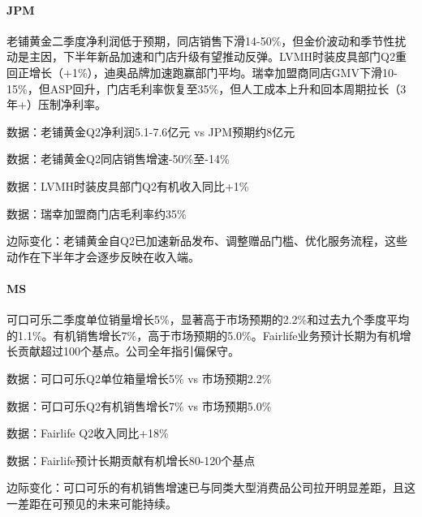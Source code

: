 \documentclass[11pt]{ctexart}
\begin{document}
\paragraph{JPM} 老铺黄金二季度净利润低于预期，同店销售下滑14-50\%，但金价波动和季节性扰动是主因，下半年新品加速和门店升级有望推动反弹。LVMH时装皮具部门Q2重回正增长（+1\%），迪奥品牌加速跑赢部门平均。瑞幸加盟商同店GMV下滑10-15\%，但ASP回升，门店毛利率恢复至35\%，但人工成本上升和回本周期拉长（3年+）压制净利率。
{\small\color{refgray}数据：老铺黄金Q2净利润5.1-7.6亿元 vs JPM预期约8亿元\par}
{\small\color{refgray}数据：老铺黄金Q2同店销售增速-50\%至-14\%\par}
{\small\color{refgray}数据：LVMH时装皮具部门Q2有机收入同比+1\%\par}
{\small\color{refgray}数据：瑞幸加盟商门店毛利率约35\%\par}
{\small\color{refgray}边际变化：老铺黄金自Q2已加速新品发布、调整赠品门槛、优化服务流程，这些动作在下半年才会逐步反映在收入端。\par}
\paragraph{MS} 可口可乐二季度单位销量增长5\%，显著高于市场预期的2.2\%和过去九个季度平均的1.1\%。有机销售增长7\%，高于市场预期的5.0\%。Fairlife业务预计长期为有机增长贡献超过100个基点。公司全年指引偏保守。
{\small\color{refgray}数据：可口可乐Q2单位箱量增长5\% vs 市场预期2.2\%\par}
{\small\color{refgray}数据：可口可乐Q2有机销售增长7\% vs 市场预期5.0\%\par}
{\small\color{refgray}数据：Fairlife Q2收入同比+18\%\par}
{\small\color{refgray}数据：Fairlife预计长期贡献有机增长80-120个基点\par}
{\small\color{refgray}边际变化：可口可乐的有机销售增速已与同类大型消费品公司拉开明显差距，且这一差距在可预见的未来可能持续。\par}
\end{document}
